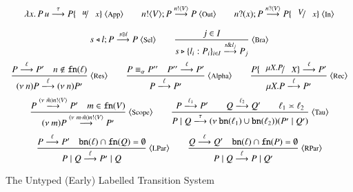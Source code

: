 \begin{figure}[t]
	\[
	\begin{array}{c}
		\appl{\abs{x}{P}}{u} \by{\tau} P \subst{u}{x}\ \ltsrule{App}
		\qquad
		\bout{n}{V} P \by{\bactout{n}{V}} P\ \ltsrule{Out}
		\qquad
		\binp{n}{x} P \by{\bactinp{n}{V}} P\subst{V}{x}\ \ltsrule{In}
		\\[4mm]

		\bsel{s}{l}{P} \by{\bactsel{s}{l}} P\ \ltsrule{Sel}
		\qquad
		\tree{
			j \in I
		}
		{
			\bbra{s}{l_i:P_i}_{i \in I} \by{\bactbra{s}{l_j}} P_j
		}\ \ltsrule{Bra}
		\\[6mm]

		\tree{
			P \by{\ell} P' \quad n \notin \fn{\ell}
		}{
			\news{n} P \by{\ell} \news{n} P' 
		}\ \ltsrule{Res}
		\qquad
		\tree{
			P \scong_\alpha P'' \quad P'' \by{\ell} P'
		}{
			P \by{\ell} P'
		}\ \ltsrule{Alpha}
		\qquad
		\tree{
			P \subst{\recp{X}{P}}{\varp{X}} \by{\ell} P'%
		}{
			\recp{X}{P} \by{\ell} P'
		}\ \ltsrule{Rec}
		\\[6mm]


		\tree{
			P \by{\news{\tilde{m}} \bactout{n}{V}} P' \quad m \in \fn{V}
		}{
			\news{m} P \by{\news{m\cat\tilde{m}} \bactout{n}{V}} P'
		}\ \ltsrule{Scope}
		\qquad
		\tree{
			P \by{\ell_1} P' \qquad Q \by{\ell_2} Q' \qquad \ell_1 \asymp \ell_2
		}{
			P \Par Q \by{\tau} \newsp{\bn{\ell_1} \cup \bn{\ell_2}}{P' \Par Q'}
		}\ \ltsrule{Tau}
		\\[6mm]

		\tree{

			P \by{\ell} P' \quad \bn{\ell} \cap \fn{Q} = \es
		}{
			P \Par Q \by{\ell} P' \Par Q
		}\ \ltsrule{LPar}
		\qquad
		\tree{
			Q \by{\ell} Q' \quad \bn{\ell} \cap \fn{P} = \es
		}{
			P \Par Q \by{\ell} P \Par Q'
		}\ \ltsrule{RPar}
	\end{array}
	\]
	\caption{The Untyped (Early) Labelled Transition System \label{fig:untyped_LTS}}
\end{figure}

